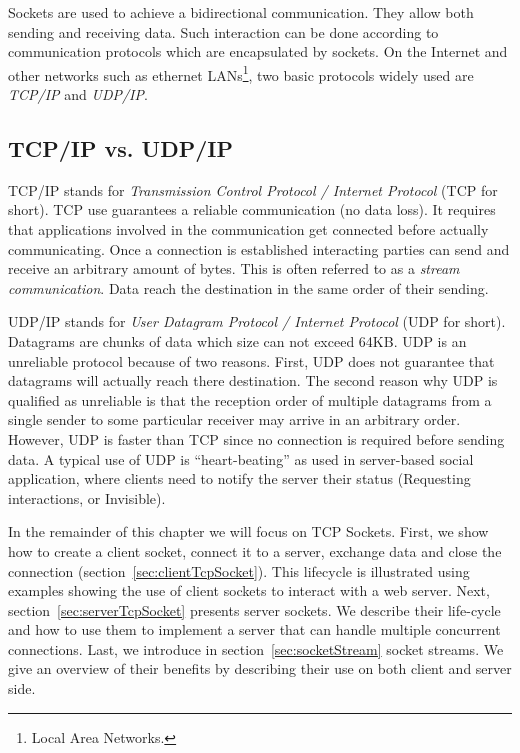 \documentclass[a4paper,10pt,twoside]{book}
\begin{document}
Sockets are used to achieve a bidirectional communication. They allow both sending and receiving data. 
Such interaction can be done according to communication protocols which are encapsulated by sockets. On the Internet and other networks such as ethernet LANs\footnote{Local Area Networks.}, two basic protocols widely used are \textit{TCP/IP} and \textit{UDP/IP}.

\subsection{TCP/IP vs. UDP/IP}
TCP/IP stands for \textit{Transmission Control Protocol / Internet Protocol} (TCP for short).
TCP use guarantees a reliable communication (no data loss). It requires that applications involved in the communication get connected before actually communicating. 
Once a connection is established interacting parties can send and receive an arbitrary amount of bytes. This is often referred to as a \textit{stream communication}.
Data reach the destination in the same order of their sending.

UDP/IP stands for \textit{User Datagram Protocol / Internet Protocol} (UDP for short).
Datagrams are chunks of data which size can not exceed 64KB.
UDP is an unreliable protocol because of two reasons.
First, UDP does not guarantee that  datagrams will actually reach there destination.
The second reason why UDP is qualified as unreliable is that the reception order of multiple datagrams from a single sender to some particular receiver may arrive in an arbitrary order.
However, UDP is faster than TCP since no connection is required before sending data.
A typical use of UDP is  ``heart-beating'' as used in server-based social application, where clients need to notify the server their status (\eg Requesting interactions, or Invisible).

In the remainder of this chapter we will focus on TCP Sockets.
First, we show how to create a client socket, connect it to a server, exchange data and close the connection (section~\ref{sec:clientTcpSocket}).
This lifecycle is illustrated using examples showing the use of client sockets to interact with a web server. 
Next, section~\ref{sec:serverTcpSocket} presents server sockets.
We describe their life-cycle and how to use them to implement a server that can handle multiple concurrent connections.
Last, we introduce in section~\ref{sec:socketStream} socket streams.
We give an overview of their benefits by describing their use on both client and server side.
 
\end{document}

